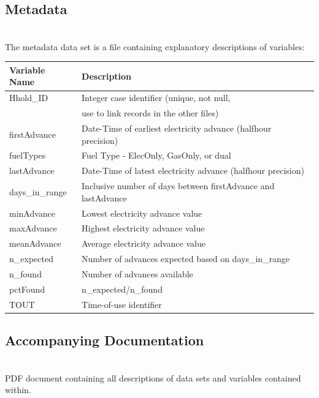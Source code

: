        \subsection{Metadata} \\
        The metadata data set is a file containing explanatory descriptions of variables:
        
        \begin{left}
            \begin{tabular}{| l | l |}
            \hline
             \textbf{Variable Name} & \textbf{Description} \\
             \hline\hline
             Hhold\_ID & Integer case identifier (unique, not null, \\& use to link records in the other files) \\ 
             \hline
             firstAdvance & Date-Time of earliest electricity advance (halfhour
             precision) \\
             \hline
             fuelTypes & Fuel Type - ElecOnly, GasOnly, or dual \\
             \hline
             lastAdvance & Date-Time of latest electricity advance (halfhour
             precision) \\
             \hline
             days\_in\_range & Inclusive number of days between firstAdvance and
             lastAdvance \\
             \hline
             minAdvance & Lowest electricity advance value \\
             \hline
             maxAdvance & Highest electricity advance value \\
             \hline
             meanAdvance & Average electricity advance value \\
             \hline
             n\_expected & Number of advances expected based on
             days\_in\_range \\
             \hline
             n\_found & Number of advances available\\
             \hline
             pctFound & n\_expected/n\_found\\
             \hline
             TOUT & Time-of-use identifier\\
             \hline
            \end{tabular}
        \end{left}
        
        \subsection{Accompanying Documentation}\\
        PDF document containing all descriptions of data sets and variables contained within.
